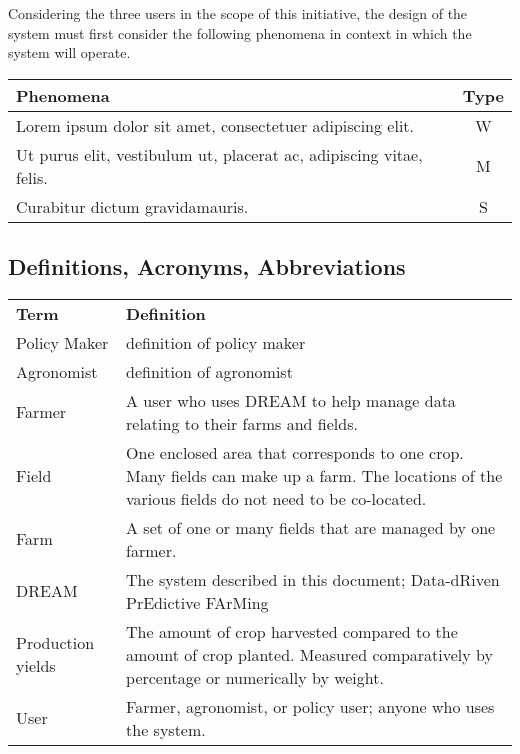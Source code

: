\begin{flushleft} %

Considering the three users in the scope of this initiative, the design of the system must first consider the following phenomena in context in which the system will operate.


\end{flushleft}
\begin{center}
\renewcommand{\arraystretch}{1.25}
\begin{tabular}{|>{\raggedright\arraybackslash}m{12cm}|c|} \hline
    \textbf{Phenomena} & \textbf{Type}\\ \hline %
    Lorem ipsum dolor sit amet, consectetuer adipiscing elit. & W \\
    \hline
    Ut purus elit, vestibulum ut, placerat ac, adipiscing vitae, felis. & M\\
    \hline
    Curabitur dictum gravidamauris. & S\\
    \hline
\end{tabular}
\end{center}

\subsection{Definitions, Acronyms, Abbreviations}


\begin{center}
\renewcommand{\arraystretch}{1.25}
\begin{tabular}{l >{\raggedright\arraybackslash}m{12cm} } \hline
    \textbf{Term} & \textbf{Definition}\\ 
	Policy Maker & definition of policy maker \\
	Agronomist & definition of agronomist \\
    Farmer & A user who uses DREAM to help manage data relating to their farms and fields.\\
    Field & One enclosed area that corresponds to one crop. Many fields can make up a farm. The locations of the various fields do not need to be co-located.\\
    Farm & A set of one or many fields that are managed by one farmer.\\
    DREAM & The system described in this document; Data-dRiven PrEdictive FArMing\\
    Production yields & The amount of crop harvested compared to the amount of crop planted. Measured comparatively by percentage or numerically by weight.\\
    User & Farmer, agronomist, or policy user; anyone who uses the system.\\
    \hline
\end{tabular}
\end{center}




